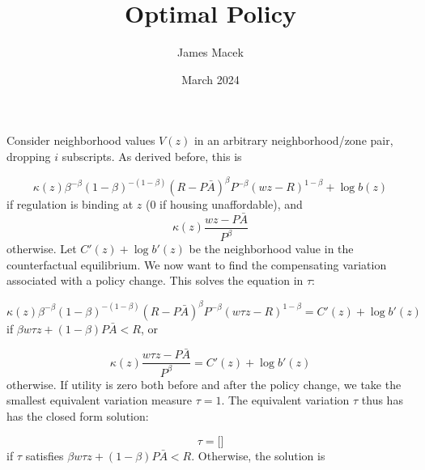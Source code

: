 \documentclass[11pt]{article}
\title{Optimal Policy}
\author{James Macek}
\date{March 2024}
\begin{document}
	
	\paragraph*{}
	Consider neighborhood values $V(z)$ in an arbitrary neighborhood/zone pair, dropping $i$ subscripts. As derived before, this is 
	
	\begin{equation*}
		\kappa(z)\beta^{-\beta}(1-\beta)^{-(1-\beta)}(R - P\bar{A})^{\beta}P^{-\beta}(wz - R)^{1 - \beta} + \log b(z)
	\end{equation*}
	if regulation is binding at $z$ (0 if housing unaffordable), and 
	\begin{equation*}
		\kappa(z)\frac{wz - P\bar{A}}{P^{\beta}}
	\end{equation*}
	otherwise. Let $C'(z) + \log b'(z)$ be the neighborhood value in the counterfactual equilibrium. We now want to find the compensating variation associated with a policy change. This solves the equation in $\tau$:
	
	\begin{equation*}
			\kappa(z)\beta^{-\beta}(1-\beta)^{-(1-\beta)}(R - P\bar{A})^{\beta}P^{-\beta}(w\tau z - R)^{1 - \beta} = C'(z) + \log b'(z)
	\end{equation*}
	if $\beta w \tau z + (1-\beta)P\bar{A} < R$, or 
	
	\begin{equation*}
			\kappa(z)\frac{w\tau z - P\bar{A}}{P^{\beta}} = C'(z) + \log b'(z)
	\end{equation*}
	otherwise. If utility is zero both before and after the policy change, we take the smallest equivalent variation measure $\tau = 1$. The equivalent variation $\tau$ thus has has the closed form solution:
	
	\begin{equation}
		\tau = \bigg[ \bigg]
	\end{equation} 
	if $\tau$ satisfies $\beta w \tau z + (1-\beta)P\bar{A} < R$. Otherwise, the solution is 
	
	
\end{document}

